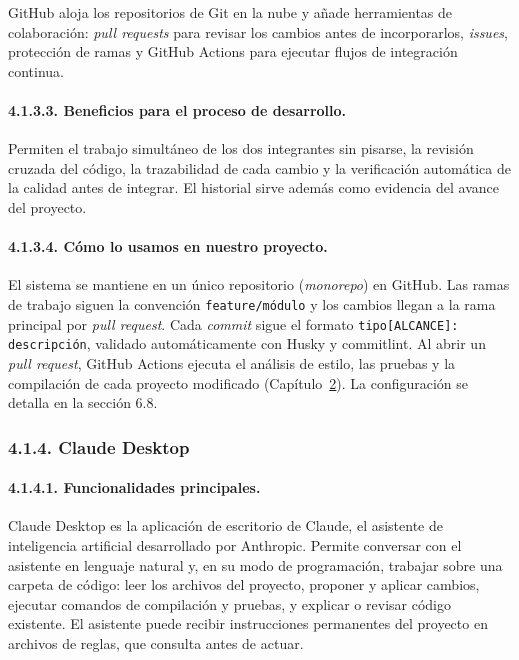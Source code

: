 GitHub aloja los repositorios de Git en la nube y añade herramientas de colaboración: \textit{pull requests} para revisar los cambios antes de incorporarlos, \textit{issues}, protección de ramas y GitHub Actions para ejecutar flujos de integración continua.

\paragraph{4.1.3.3. Beneficios para el proceso de desarrollo.}

Permiten el trabajo simultáneo de los dos integrantes sin pisarse, la revisión cruzada del código, la trazabilidad de cada cambio y la verificación automática de la calidad antes de integrar. El historial sirve además como evidencia del avance del proyecto.

\paragraph{4.1.3.4. Cómo lo usamos en nuestro proyecto.}

El sistema se mantiene en un único repositorio (\textit{monorepo}) en GitHub. Las ramas de trabajo siguen la convención \texttt{feature/m\'odulo} y los cambios llegan a la rama principal por \textit{pull request}. Cada \textit{commit} sigue el formato \texttt{tipo[ALCANCE]: descripci\'on}, validado automáticamente con Husky y commitlint. Al abrir un \textit{pull request}, GitHub Actions ejecuta el análisis de estilo, las pruebas y la compilación de cada proyecto modificado (Capítulo~\hyperref[cap:sqap]{2}). La configuración se detalla en la sección 6.8.

\subsubsection{4.1.4. Claude Desktop}

\paragraph{4.1.4.1. Funcionalidades principales.}

Claude Desktop es la aplicación de escritorio de Claude, el asistente de inteligencia artificial desarrollado por Anthropic. Permite conversar con el asistente en lenguaje natural y, en su modo de programación, trabajar sobre una carpeta de código: leer los archivos del proyecto, proponer y aplicar cambios, ejecutar comandos de compilación y pruebas, y explicar o revisar código existente. El asistente puede recibir instrucciones permanentes del proyecto en archivos de reglas, que consulta antes de actuar.

